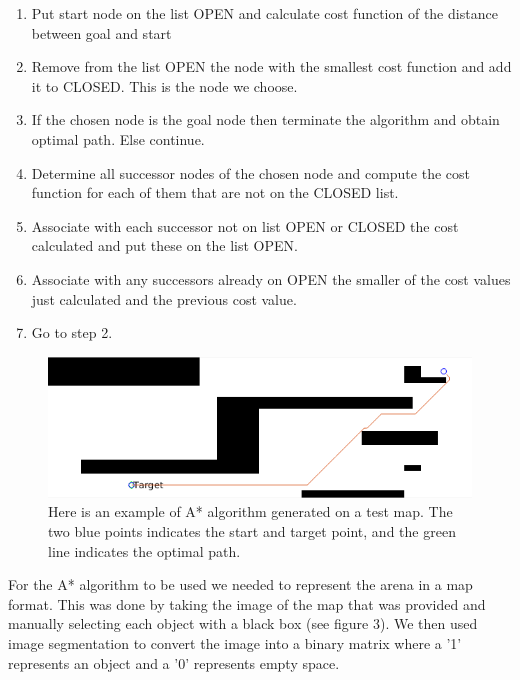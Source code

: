 \documentclass[]{article}
\begin{document}
\begin{enumerate}
 \item Put start node on the list OPEN and calculate cost function of the distance between goal and start
 \item Remove from the list OPEN the node with the smallest cost function and add it to CLOSED. This is the node we choose.
 \item If the chosen node is the goal node then terminate the algorithm and obtain optimal path. Else continue.
 \item Determine all successor nodes of the chosen node and compute the cost function for each of them that are not on the CLOSED list.
 \item Associate with each successor not on list OPEN or CLOSED the cost calculated and put these on the list OPEN.
 \item Associate with any successors already on OPEN the smaller of the cost values just calculated and the previous cost value.
 \item Go to step 2.
\end{enumerate}

\begin{figure}[h]
 \includegraphics[scale=0.5]{A_1}
 \centering
 \caption{Here is an example of A* algorithm generated on a test map. The two blue points indicates the start and target point, and the green line indicates the optimal path.}
\end{figure}
\begin{center} 
\end{center}
For the A* algorithm to be used we needed to represent the arena in a map format. This was done by taking the image of the map that was provided and manually selecting each object with a black box (see figure 3). We then used image segmentation to convert the image into a binary matrix where a '1' represents an object and a '0' represents empty space.
\end{document}
